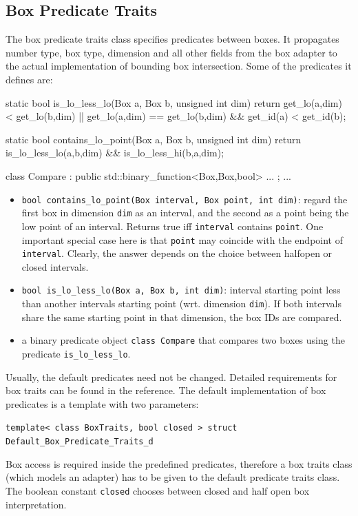 \subsection{Box Predicate Traits}
The box predicate traits class specifies predicates between boxes. It propagates number type, box type, dimension and all other fields from the box adapter to the actual implementation of bounding box intersection. Some of the predicates it defines are:
\begin{ccExampleCode}
    static bool is_lo_less_lo(Box a, Box b, unsigned int dim) {
        return get_lo(a,dim)  < get_lo(b,dim) ||
               get_lo(a,dim) == get_lo(b,dim) && get_id(a) < get_id(b);
    }

    static bool contains_lo_point(Box a, Box b, unsigned int dim)
    { return is_lo_less_lo(a,b,dim) && is_lo_less_hi(b,a,dim);  }

    class Compare : public std::binary_function<Box,Box,bool> { ... };
    ...
\end{ccExampleCode}

\begin{itemize}
 \item \texttt{bool contains\_lo\_point(Box interval, Box point, int dim)}: regard the first box in dimension \texttt{dim} as an interval, and the second as a point being the low point of an interval. Returns true iff \texttt{interval} contains \texttt{point}. One important special case here is that \texttt{point} may coincide with the endpoint of \texttt{interval}. Clearly, the answer depends on the choice between halfopen or closed intervals.
 \item \texttt{bool is\_lo\_less\_lo(Box a, Box b, int dim)}: interval starting point less than another intervals starting point (wrt. dimension \texttt{dim}). If both intervals share the same starting point in that dimension, the box IDs are compared.
 \item a binary predicate object \texttt{class Compare} that compares two boxes using the predicate \texttt{is\_lo\_less\_lo}.
\end{itemize}

Usually, the default predicates need not be changed. Detailed requirements for box traits can be found in the reference. The default implementation of box predicates is a template with two parameters:

\texttt{template< class BoxTraits, bool closed > struct Default\_Box\_Predicate\_Traits\_d}

Box access is required inside the predefined predicates, therefore a box traits class (which models an adapter) has to be given to the default predicate traits class. The boolean constant \texttt{closed} chooses between closed and half open box interpretation.


